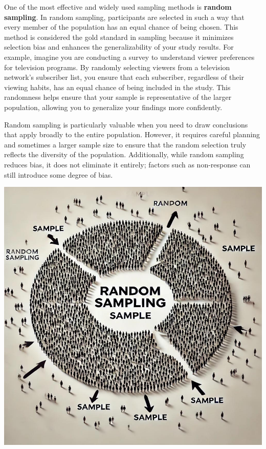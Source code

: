 \documentclass[
]{book}
\begin{document}
One of the most effective and widely used sampling methods is \textbf{random sampling}. In random sampling, participants are selected in such a way that every member of the population has an equal chance of being chosen. This method is considered the gold standard in sampling because it minimizes selection bias and enhances the generalizability of your study results. For example, imagine you are conducting a survey to understand viewer preferences for television programs. By randomly selecting viewers from a television network's subscriber list, you ensure that each subscriber, regardless of their viewing habits, has an equal chance of being included in the study. This randomness helps ensure that your sample is representative of the larger population, allowing you to generalize your findings more confidently.

Random sampling is particularly valuable when you need to draw conclusions that apply broadly to the entire population. However, it requires careful planning and sometimes a larger sample size to ensure that the random selection truly reflects the diversity of the population. Additionally, while random sampling reduces bias, it does not eliminate it entirely; factors such as non-response can still introduce some degree of bias.

\includegraphics[width=1\textwidth,height=\textheight]{images/fig034.jpg}
\end{document}
